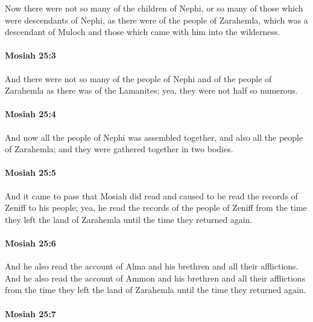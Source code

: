 			Now there were not so many of the children of Nephi,
			or so many of those which were descendants of Nephi,
			as there were of the people of Zarahemla,
			which was a descendant of Muloch
			and those which came with him into the wilderness.

		\paragraph{Mosiah 25:3} %
			\label{MOSIAH-25-3}

			And there were not so many
			of the people of Nephi and of the people of Zarahemla
			as there was of the Lamanites;
			yea, they were not half so numerous.

		\paragraph{Mosiah 25:4} %
			\label{MOSIAH-25-4}

			And now all the people of Nephi was assembled together,
			and also all the people of Zarahemla;
			and they were gathered together in two bodies.

		\paragraph{Mosiah 25:5} %
			\label{MOSIAH-25-5}

			And it came to pass that Mosiah did read
			and caused to be read the records of Zeniff to his people;
			yea, he read the records of the people of Zeniff
			from the time they left the land of Zarahemla until the time they returned again.

		\paragraph{Mosiah 25:6} %
			\label{MOSIAH-25-6}

			And he also read the account of Alma and his brethren and all their afflictions.
			And he also read the account of Ammon and his brethren and all their afflictions
			from the time they left the land of Zarahemla until the time they returned again.

		\paragraph{Mosiah 25:7} %
			\label{MOSIAH-25-7}

